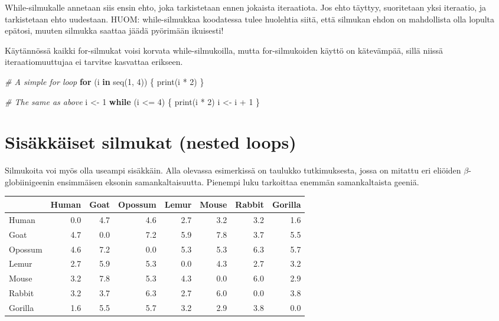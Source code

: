 \documentclass[
]{book}
\newenvironment{Shaded}{\begin{snugshade}}{\end{snugshade}}
\newcommand{\CommentTok}[1]{\textcolor[rgb]{0.56,0.35,0.01}{\textit{#1}}}
\newcommand{\ControlFlowTok}[1]{\textcolor[rgb]{0.13,0.29,0.53}{\textbf{#1}}}
\newcommand{\DecValTok}[1]{\textcolor[rgb]{0.00,0.00,0.81}{#1}}
\newcommand{\FunctionTok}[1]{\textcolor[rgb]{0.00,0.00,0.00}{#1}}
\newcommand{\NormalTok}[1]{#1}
\newcommand{\OtherTok}[1]{\textcolor[rgb]{0.56,0.35,0.01}{#1}}
\newcommand{\SpecialCharTok}[1]{\textcolor[rgb]{0.00,0.00,0.00}{#1}}
\begin{document}
While-silmukalle annetaan siis ensin ehto, joka tarkistetaan ennen jokaista iteraatiota. Jos ehto täyttyy, suoritetaan yksi iteraatio, ja tarkistetaan ehto uudestaan. HUOM: while-silmukkaa koodatessa tulee huolehtia siitä, että silmukan ehdon on mahdollista olla lopulta epätosi, muuten silmukka saattaa jäädä pyörimään ikuisesti!

Käytännössä kaikki for-silmukat voisi korvata while-silmukoilla, mutta for-silmukoiden käyttö on kätevämpää, sillä niissä iteraatiomuuttujaa ei tarvitse kasvattaa erikseen.

\begin{Shaded}
\begin{Highlighting}[]
\CommentTok{\# A simple for loop}
\ControlFlowTok{for}\NormalTok{ (i }\ControlFlowTok{in} \FunctionTok{seq}\NormalTok{(}\DecValTok{1}\NormalTok{, }\DecValTok{4}\NormalTok{)) \{}
  \FunctionTok{print}\NormalTok{(i }\SpecialCharTok{*} \DecValTok{2}\NormalTok{)}
\NormalTok{\}}

\CommentTok{\# The same as above}
\NormalTok{i }\OtherTok{\textless{}{-}} \DecValTok{1}
\ControlFlowTok{while}\NormalTok{ (i }\SpecialCharTok{\textless{}=} \DecValTok{4}\NormalTok{) \{}
  \FunctionTok{print}\NormalTok{(i }\SpecialCharTok{*} \DecValTok{2}\NormalTok{)}
\NormalTok{  i }\OtherTok{\textless{}{-}}\NormalTok{ i }\SpecialCharTok{+} \DecValTok{1}
\NormalTok{\}}
\end{Highlighting}
\end{Shaded}

\hypertarget{sisuxe4kkuxe4iset-silmukat-nested-loops}{%
\section{Sisäkkäiset silmukat (nested loops)}\label{sisuxe4kkuxe4iset-silmukat-nested-loops}}

Silmukoita voi myös olla useampi sisäkkäin. Alla olevassa esimerkissä on taulukko tutkimuksesta, jossa on mitattu eri eliöiden \(\beta\)- globiinigeenin ensimmäisen eksonin samankaltaisuutta. Pienempi luku tarkoittaa enemmän samankaltaista geeniä.

\begin{tabular}{l|r|r|r|r|r|r|r}
\hline
  & Human & Goat & Opossum & Lemur & Mouse & Rabbit & Gorilla\\
\hline
Human & 0.0 & 4.7 & 4.6 & 2.7 & 3.2 & 3.2 & 1.6\\
\hline
Goat & 4.7 & 0.0 & 7.2 & 5.9 & 7.8 & 3.7 & 5.5\\
\hline
Opossum & 4.6 & 7.2 & 0.0 & 5.3 & 5.3 & 6.3 & 5.7\\
\hline
Lemur & 2.7 & 5.9 & 5.3 & 0.0 & 4.3 & 2.7 & 3.2\\
\hline
Mouse & 3.2 & 7.8 & 5.3 & 4.3 & 0.0 & 6.0 & 2.9\\
\hline
Rabbit & 3.2 & 3.7 & 6.3 & 2.7 & 6.0 & 0.0 & 3.8\\
\hline
Gorilla & 1.6 & 5.5 & 5.7 & 3.2 & 2.9 & 3.8 & 0.0\\
\hline
\end{tabular}
\end{document}

